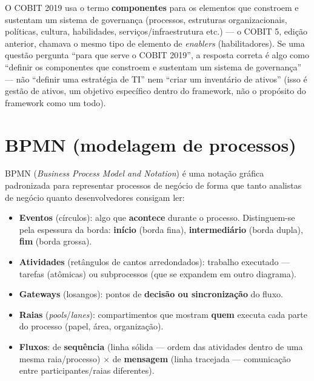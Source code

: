 \begin{conceito}
O COBIT 2019 usa o termo \textbf{componentes} para os elementos que
constroem e sustentam um sistema de governança (processos, estruturas
organizacionais, políticas, cultura, habilidades, serviços/infraestrutura
etc.) --- o COBIT 5, edição anterior, chamava o mesmo tipo de elemento de
\textit{enablers} (habilitadores). Se uma questão pergunta “para que serve o
COBIT 2019”, a resposta correta é algo como “definir os componentes que
constroem e sustentam um sistema de governança” --- não “definir uma
estratégia de TI” nem “criar um inventário de ativos” (isso é gestão de
ativos, um objetivo específico dentro do framework, não o propósito do
framework como um todo).
\end{conceito}

\section{BPMN (modelagem de processos)}
\label{sec:bpmn-teoria}

\begin{conceito}
BPMN (\textit{Business Process Model and Notation}) é uma notação gráfica
padronizada para representar processos de negócio de forma que tanto
analistas de negócio quanto desenvolvedores consigam ler:

\begin{itemize}
\item \textbf{Eventos} (círculos): algo que \textbf{acontece} durante o
processo. Distinguem-se pela espessura da borda: \textbf{início} (borda
fina), \textbf{intermediário} (borda dupla), \textbf{fim} (borda grossa).
\item \textbf{Atividades} (retângulos de cantos arredondados): trabalho
executado --- tarefas (atômicas) ou subprocessos (que se expandem em outro
diagrama).
\item \textbf{Gateways} (losangos): pontos de \textbf{decisão ou
sincronização} do fluxo.
\item \textbf{Raias} (\textit{pools}/\textit{lanes}): compartimentos que
mostram \textbf{quem} executa cada parte do processo (papel, área,
organização).
\item \textbf{Fluxos}: de \textbf{sequência} (linha sólida --- ordem das
atividades dentro de uma mesma raia/processo) $\times$ de \textbf{mensagem}
(linha tracejada --- comunicação entre participantes/raias diferentes).
\end{itemize}
\end{conceito}

